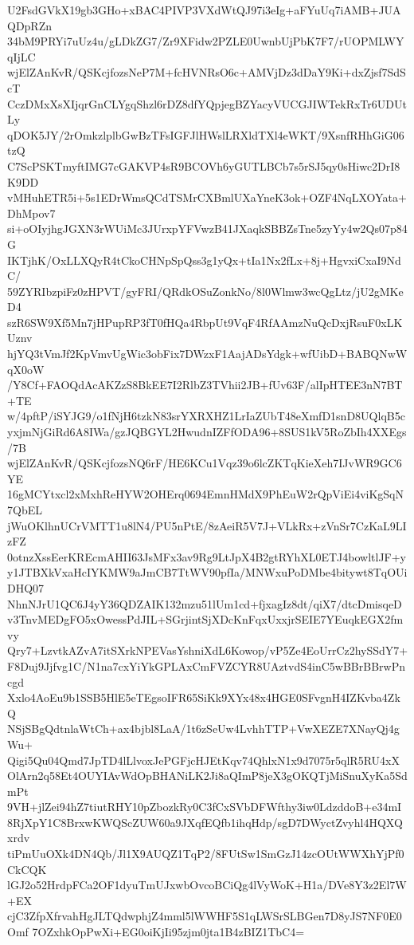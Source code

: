 U2FsdGVkX19gb3GHo+xBAC4PIVP3VXdWtQJ97i3eIg+aFYuUq7iAMB+JUAQDpRZn
34bM9PRYi7uUz4u/gLDkZG7/Zr9XFidw2PZLE0UwnbUjPbK7F7/rUOPMLWYqIjLC
wjElZAnKvR/QSKcjfozsNeP7M+fcHVNRsO6c+AMVjDz3dDaY9Ki+dxZjsf7SdScT
CczDMxXsXIjqrGnCLYgqShzl6rDZ8dfYQpjegBZYacyVUCGJIWTekRxTr6UDUtLy
qDOK5JY/2rOmkzlplbGwBzTFsIGFJlHWslLRXldTXl4eWKT/9XsnfRHhGiG06tzQ
C7ScPSKTmyftIMG7cGAKVP4sR9BCOVh6yGUTLBCb7s5rSJ5qy0sHiwc2DrI8K9DD
vMHuhETR5i+5s1EDrWmsQCdTSMrCXBmlUXaYneK3ok+OZF4NqLXOYata+DhMpov7
si+oOIyjhgJGXN3rWUiMc3JUrxpYFVwzB41JXaqkSBBZsTne5zyYy4w2Qs07p84G
IKTjhK/OxLLXQyR4tCkoCHNpSpQss3g1yQx+tIa1Nx2fLx+8j+HgvxiCxaI9NdC/
59ZYRIbzpiFz0zHPVT/gyFRI/QRdkOSuZonkNo/8l0Wlmw3wcQgLtz/jU2gMKeD4
szR6SW9Xf5Mn7jHPupRP3fT0fHQa4RbpUt9VqF4RfAAmzNuQcDxjRsuF0xLKUznv
hjYQ3tVmJf2KpVmvUgWic3obFix7DWzxF1AajADsYdgk+wfUibD+BABQNwWqX0oW
/Y8Cf+FAOQdAcAKZzS8BkEE7I2RlbZ3TVhii2JB+fUv63F/alIpHTEE3nN7BT+TE
w/4pftP/iSYJG9/o1fNjH6tzkN83srYXRXHZ1LrIaZUbT48eXmfD1snD8UQlqB5c
yxjmNjGiRd6A8IWa/gzJQBGYL2HwudnIZFfODA96+8SUS1kV5RoZbIh4XXEgs/7B
wjElZAnKvR/QSKcjfozsNQ6rF/HE6KCu1Vqz39o6lcZKTqKieXeh7IJvWR9GC6YE
16gMCYtxcl2xMxhReHYW2OHErq0694EmnHMdX9PhEuW2rQpViEi4viKgSqN7QbEL
jWuOKlhnUCrVMTT1u8lN4/PU5nPtE/8zAeiR5V7J+VLkRx+zVnSr7CzKaL9LIzFZ
0otnzXssEerKREcmAHII63JsMFx3av9Rg9LtJpX4B2gtRYhXL0ETJ4bowltlJF+y
y1JTBXkVxaHcIYKMW9aJmCB7TtWV90pfIa/MNWxuPoDMbe4bitywt8TqOUiDHQ07
NhnNJrU1QC6J4yY36QDZAIK132mzu51lUm1cd+fjxagIz8dt/qiX7/dtcDmisqeD
v3TnvMEDgFO5xOwessPdJIL+SGrjintSjXDcKnFqxUxxjrSEIE7YEuqkEGX2fmvy
Qry7+LzvtkAZvA7itSXrkNPEVasYshniXdL6Kowop/vP5Ze4EoUrrCz2hySSdY7+
F8Duj9Jjfvg1C/N1na7cxYiYkGPLAxCmFVZCYR8UAztvdS4inC5wBBrBBrwPncgd
Xxlo4AoEu9b1SSB5HlE5eTEgsoIFR65SiKk9XYx48x4HGE0SFvgnH4IZKvba4ZkQ
NSjSBgQdtnlaWtCh+ax4bjbl8LaA/1t6zSeUw4LvhhTTP+VwXEZE7XNayQj4gWu+
Qigi5Qu04Qmd7JpTD4lLlvoxJePGFjcHJEtKqv74QhlxN1x9d7075r5qlR5RU4xX
OlArn2q58Et4OUYIAvWdOpBHANiLK2Ji8aQImP8jeX3gOKQTjMiSnuXyKa5SdmPt
9VH+jlZei94hZ7tiutRHY10pZbozkRy0C3fCxSVbDFWfthy3iw0LdzddoB+e34mI
8RjXpY1C8BrxwKWQScZUW60a9JXqfEQfb1ihqHdp/sgD7DWyctZvyhl4HQXQxrdv
tiPmUuOXk4DN4Qb/Jl1X9AUQZ1TqP2/8FUtSw1SmGzJ14zcOUtWWXhYjPf0CkCQK
lGJ2o52HrdpFCa2OF1dyuTmUJxwbOvcoBCiQg4lVyWoK+H1a/DVe8Y3z2El7W+EX
cjC3ZfpXfrvahHgJLTQdwphjZ4mml5lWWHF5S1qLWSrSLBGen7D8yJS7NF0E0Omf
7OZxhkOpPwXi+EG0oiKjIi95zjm0jta1B4zBIZ1TbC4=
